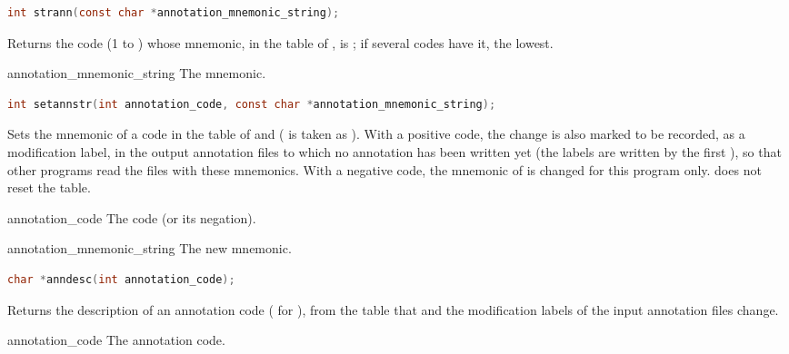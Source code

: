 \begin{lstlisting}[language=C,style=signature]
int strann(const char *annotation_mnemonic_string);
\end{lstlisting}
Returns the code (1 to ) whose mnemonic, in the table of
, is ; if several codes have
it, the lowest.
\begin{params}
\item[annotation\_mnemonic\_string] The mnemonic.
\end{params}

\begin{lstlisting}[language=C,style=signature]
int setannstr(int annotation_code, const char *annotation_mnemonic_string);
\end{lstlisting}
Sets the mnemonic of a code in the table of  and 
( is taken as ). With a positive code, the change is also
marked to be recorded, as a modification label, in the output annotation
files to which no annotation has been written yet (the labels are written by
the first ), so that other programs read the files with these
mnemonics. With a negative code, the mnemonic of  is changed for
this program only.  does not reset the table.
\begin{params}
\item[annotation\_code] The code (or its negation).
\item[annotation\_mnemonic\_string] The new mnemonic.
\end{params}

\begin{lstlisting}[language=C,style=signature]
char *anndesc(int annotation_code);
\end{lstlisting}
Returns the description of an annotation code ( for
), from the table that  and the modification
labels of the input annotation files change.
\begin{params}
\item[annotation\_code] The annotation code.
\end{params}

